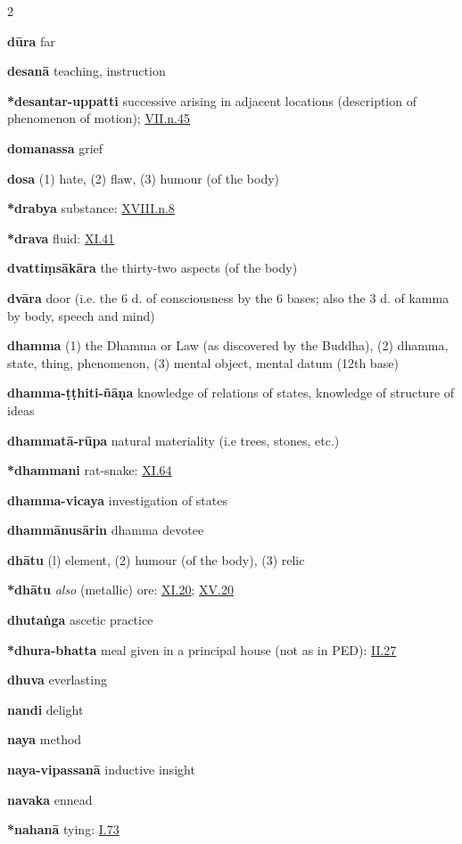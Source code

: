 \begin{multicols}{2}
\begin{vismHanging}
\par\textbf{dūra} far
\par\textbf{desanā} teaching, instruction
\par\textbf{*desantar-uppatti} successive arising in adjacent locations (description of phenomenon of motion); \hyperlink{VII.n45}{VII.n.45}{} 
\par\textbf{domanassa} grief
\par\textbf{dosa} (1) hate, (2) flaw, (3) humour (of the body) 
\par\textbf{*drabya} substance: \hyperlink{XVIII.n8}{XVIII.n.8}{}
\par\textbf{*drava} fluid: \hyperlink{XI.41}{XI.41}{}
\par\textbf{dvattiṃsākāra} the thirty-two aspects (of the body) 
\par\textbf{dvāra} door (i.e. the 6 d. of consciousness by the 6 bases; also the 3 d. of kamma by body, speech and mind)
\par\textbf{dhamma} (1) the Dhamma or Law (as discovered by the Buddha), (2) dhamma, state, thing, phenomenon, (3) mental object, mental datum (12th base) 
\par\textbf{dhamma-ṭṭhiti-ñāṇa} knowledge of relations of states, knowledge of structure of ideas 
\par\textbf{dhammatā-rūpa} natural materiality (i.e trees, stones, etc.) 
\par\textbf{*dhammani} rat-snake: \hyperlink{XI.64}{XI.64}{}
\par\textbf{dhamma-vicaya} investigation of states
\par\textbf{dhammānusārin} dhamma devotee 
\par\textbf{dhātu} (l) element, (2) humour (of the body), (3) relic 
\par\textbf{*dhātu} \emph{also }(metallic) ore: \hyperlink{XI.20}{XI.20}{}; \hyperlink{XV.20}{XV.20}{}
\par\textbf{dhutaṅga} ascetic practice
\par\textbf{*dhura-bhatta} meal given in a principal house (not as in PED): \hyperlink{II.27}{II.27}{} 
\par\textbf{dhuva} everlasting 
\par\textbf{nandi} delight 
\par\textbf{naya} method
\par\textbf{naya-vipassanā} inductive insight
\par\textbf{navaka} ennead
\par\textbf{*nahanā} tying: \hyperlink{I.73}{I.73}{}

\end{vismHanging}
\end{multicols}
